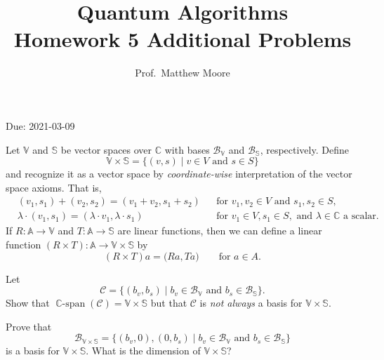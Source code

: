 \documentclass[oneside]{amsart}  %
\newcommand{\CC}{\mathbb{C}}
\newcommand{\m}[1]{\mathbb{#1}}      %
\newcommand{\alg}[1]{\m{#1}}         %
\newcommand{\cl}[1]{\mathcal{#1}}    %
\theoremstyle{plain}
\theoremstyle{definition}
\theoremstyle{remark}
\numberwithin{equation}{section}  %
\newif\ifsolutions
\DeclareMathOperator{\Cspan}{ \CC-span }
\begin{document}
\title[Quantum Algorithms, HW 5 Additional Problems]
  {Quantum Algorithms \\ Homework 5 Additional Problems}
\author{Prof.~Matthew Moore}
\maketitle

\vspace{-0.7em} \begin{center}
  \sc Due: 2021-03-09
\end{center}

\vspace{2em}

\begin{questions}
\item Let $\alg{V}$ and $\alg{S}$ be vector spaces over $\CC$ with bases
$\cl{B}_{\alg{V}}$ and $\cl{B}_{\alg{S}}$, respectively. Define
\[
  \alg{V}\times \alg{S}
  = \big\{ (v,s)\mid v\in V \text{ and } s\in S \big\}
\]
and recognize it as a vector space by \emph{coordinate-wise} interpretation
of the vector space axioms. That is,
\begin{align*}
  &(v_1,s_1) + (v_2,s_2) = (v_1+v_2, s_1+s_2)                     && \text{for } v_1,v_2\in V \text{ and } s_1,s_2\in S, \\
  &\lambda \cdot (v_1,s_1) = (\lambda\cdot v_1, \lambda\cdot s_1) && \text{for } v_1\in V, s_1\in S, \text{ and } \lambda\in \CC \text{ a scalar}.
\end{align*}
If $R: \alg{A} \to \alg{V}$ and $T:\alg{A}\to \alg{S}$ are linear functions,
then we can define a linear function $(R\times T):\alg{A} \to \alg{V}\times
\alg{S}$ by
\[
  (R\times T)a = \big( Ra, Ta \big)
  \qquad\text{for } a\in A.
\]

\begin{questions}
  \item Let
  \[
    \cl{C}
    = \big\{ (b_v,b_s) \mid b_v\in \cl{B}_{\alg{V}} \text{ and } b_s\in
      \cl{B}_{\alg{S}} \big\}.
  \]
  Show that $\Cspan(\cl{C}) = \alg{V}\times \alg{S}$ but that $\cl{C}$ is
  \emph{not always} a basis for $\alg{V}\times \alg{S}$.


  \item Prove that
  \[
    \cl{B}_{\alg{V}\times \alg{S}}
    = \big\{ (b_v,0), (0,b_s) \mid b_v\in \cl{B}_{\alg{V}} \text{ and } b_s\in
    \cl{B}_{\alg{S}} \big\}
  \]
  is a basis for $\alg{V}\times \alg{S}$. What is the dimension of
  $\alg{V}\times \alg{S}$?



\end{questions}
\end{questions}
\end{document}
